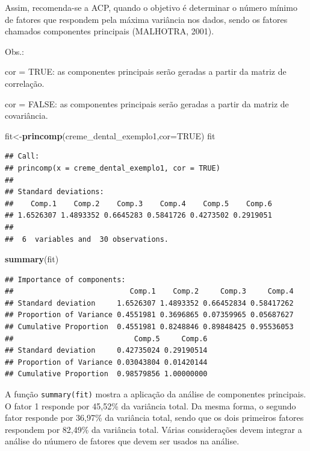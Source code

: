 \documentclass[12pt,brazil,]{book}
\newenvironment{Shaded}{\begin{snugshade}}{\end{snugshade}}
\newcommand{\DataTypeTok}[1]{\textcolor[rgb]{0.13,0.29,0.53}{#1}}
\newcommand{\KeywordTok}[1]{\textcolor[rgb]{0.13,0.29,0.53}{\textbf{#1}}}
\newcommand{\NormalTok}[1]{#1}
\newcommand{\OtherTok}[1]{\textcolor[rgb]{0.56,0.35,0.01}{#1}}
\begin{document}
Assim, recomenda-se a ACP, quando o objetivo é determinar o número
mínimo de fatores que respondem pela máxima variância nos dados, sendo
os fatores chamados componentes principais (MALHOTRA, 2001).

Obs.:

cor = TRUE: as componentes principais serão geradas a partir da matriz
de correlação.

cor = FALSE: as componentes principais serão geradas a partir da matriz
de covariância.

\begin{Shaded}
\begin{Highlighting}[]
\NormalTok{fit<-}\KeywordTok{princomp}\NormalTok{(creme_dental_exemplo1,}\DataTypeTok{cor=}\OtherTok{TRUE}\NormalTok{)}
\NormalTok{fit}
\end{Highlighting}
\end{Shaded}

\begin{verbatim}
## Call:
## princomp(x = creme_dental_exemplo1, cor = TRUE)
## 
## Standard deviations:
##    Comp.1    Comp.2    Comp.3    Comp.4    Comp.5    Comp.6 
## 1.6526307 1.4893352 0.6645283 0.5841726 0.4273502 0.2919051 
## 
##  6  variables and  30 observations.
\end{verbatim}

\begin{Shaded}
\begin{Highlighting}[]
\KeywordTok{summary}\NormalTok{(fit)}
\end{Highlighting}
\end{Shaded}

\begin{verbatim}
## Importance of components:
##                           Comp.1    Comp.2     Comp.3     Comp.4
## Standard deviation     1.6526307 1.4893352 0.66452834 0.58417262
## Proportion of Variance 0.4551981 0.3696865 0.07359965 0.05687627
## Cumulative Proportion  0.4551981 0.8248846 0.89848425 0.95536053
##                            Comp.5     Comp.6
## Standard deviation     0.42735024 0.29190514
## Proportion of Variance 0.03043804 0.01420144
## Cumulative Proportion  0.98579856 1.00000000
\end{verbatim}

A função \texttt{summary(fit)} mostra a aplicação da análise de
componentes principais. O fator 1 responde por 45,52\% da variância
total. Da mesma forma, o segundo fator responde por 36,97\% da variância
total, sendo que os dois primeiros fatores respondem por 82,49\% da
variância total. Várias considerações devem integrar a análise do
núumero de fatores que devem ser usados na análise.
\end{document}
